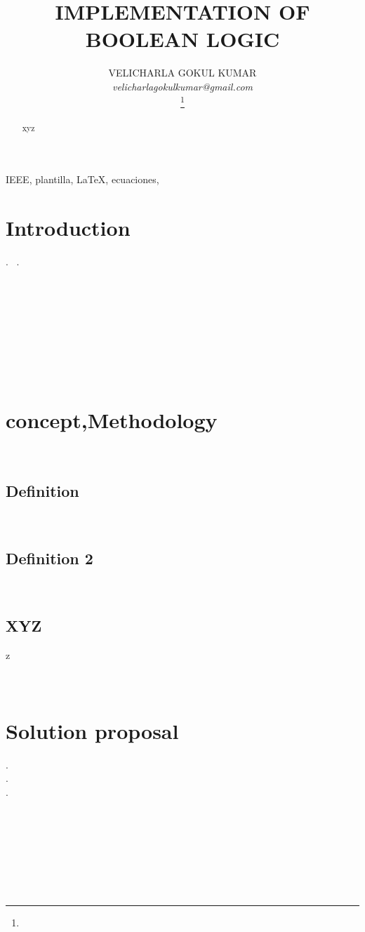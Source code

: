 \documentclass[journal]{IEEEtran}
\begin{document}
\title{IMPLEMENTATION OF BOOLEAN LOGIC}
\author{VELICHARLA GOKUL KUMAR\\
				\textit{velicharlagokulkumar@gmail.com}\\
\thanks{}} 
\maketitle
\begin{abstract}
xyz
\end{abstract}

\begin{IEEEkeywords}
IEEE, plantilla, \LaTeX, ecuaciones, 
\end{IEEEkeywords}

\section{Introduction}
.
\
.
\\
\\
\\
\\
\\
\\
\\
\\ 
\\ 
\section{concept,Methodology}	
\
\
\
\
\
\
\
\
\
\
\
\
\subsection{Definition}
\
\
\
\
\subsection{Definition 2}
\
\
\
\
\subsection{XYZ}
z
\\
 \cite{nombre_para_citar} \\
 \cite{kopka} \\
 \cite{link} 

\section{Solution proposal}
.
\\
.
\\
.
\\
\\
\\
\\
\\
\\
\\ 
\\
\end{document}
